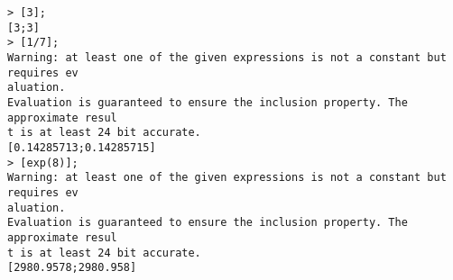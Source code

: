 \begin{center}\begin{minipage}{15cm}\begin{Verbatim}[frame=single]
> [3];
[3;3]
> [1/7];
Warning: at least one of the given expressions is not a constant but requires ev
aluation.
Evaluation is guaranteed to ensure the inclusion property. The approximate resul
t is at least 24 bit accurate.
[0.14285713;0.14285715]
> [exp(8)];
Warning: at least one of the given expressions is not a constant but requires ev
aluation.
Evaluation is guaranteed to ensure the inclusion property. The approximate resul
t is at least 24 bit accurate.
[2980.9578;2980.958]
\end{Verbatim}
\end{minipage}\end{center}
